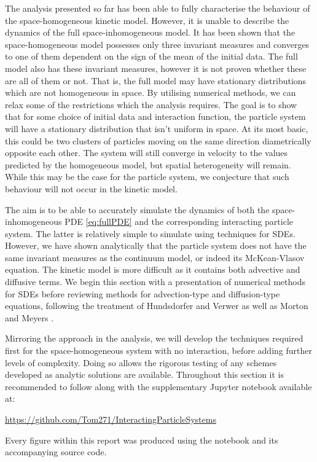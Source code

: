 The analysis presented so far has been able to fully characterise the behaviour of the space-homogeneous kinetic model. However, it is unable to describe the dynamics of the full space-inhomogeneous model. It has been shown that the space-homogeneous model possesses only three invariant measures and converges to one of them dependent on the sign of the mean of the initial data. The full model also has these invariant measures, however it is not proven whether these are all of them or not. That is, the full model may have stationary distributions which are not homogeneous in space. By utilising numerical methods, we can relax some of the restrictions which the analysis requires. The goal is to show that for some choice of initial data and interaction function, the particle system will have a stationary distribution that isn't uniform in space. At its most basic, this could be two clusters of particles moving on the same direction diametrically opposite each other. The system will still converge in velocity to the values predicted by the homogeneous model, but spatial heterogeneity will remain. While this may be the case for the particle system, we conjecture that such behaviour will not occur in the kinetic model.

The aim is to be able to accurately simulate the dynamics of both the space-inhomogeneous PDE \eqref{eq:fullPDE} and the corresponding interacting particle system. The latter is relatively simple to simulate using techniques for SDEs. However, we have shown analytically that the particle system does not have the same invariant measures as the continuum model, or indeed its McKean-Vlasov equation. The kinetic model is more difficult as it contains both advective and diffusive terms. We begin this section with a presentation of numerical methods for SDEs before reviewing methods for advection-type and diffusion-type equations, following the treatment of Hundsdorfer and Verwer \cite{Hundsdorfer2007} as well as Morton and Meyers \cite{Morton2005}.

Mirroring the approach in the analysis, we will develop the techniques required first for the space-homogeneous system with no interaction, before adding further levels of complexity. Doing so allows the rigorous testing of any schemes developed as analytic solutions are available. Throughout this section it is recommended to follow along with the supplementary Jupyter notebook available at: 
 \begin{center}\url{https://github.com/Tom271/InteractingParticleSystems}\end{center}
Every figure within this report was produced using the notebook and its accompanying source code.

